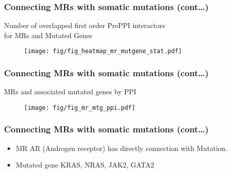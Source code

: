 \documentclass{beamer}
\begin{document}
\begin{frame}[fragile] %
\frametitle{Connecting MRs with somatic mutations (cont\dots) }
\centering Number of overlapped first order PrePPI interactors \\
 for MRs and Mutated Genes
\begin{figure}
   \texttt{[image: fig/fig\_heatmap\_mr\_mutgene\_stat.pdf]}
\end{figure}
\end{frame}
\begin{frame}
\frametitle{Connecting MRs with somatic mutations (cont\dots)}
	\centering MRs and associated mutated genes by PPI
\begin{figure}
	\texttt{[image: fig/fig\_mr\_mtg\_ppi.pdf]}
\end{figure}
\end{frame}
\begin{frame}[fragile] %
\frametitle{Connecting MRs with somatic mutations (cont\dots)}
\begin{itemize}
	\item MR AR (Androgen receptor) has directly connection with Mutation.
	\item Mutated gene KRAS, NRAS, JAK2, GATA2 
\end{itemize}
\end{frame}
\end{document}
